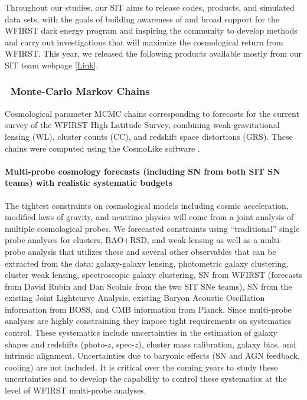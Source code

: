 Throughout our studies, our SIT aims to release codes, products, and simulated data sets, with the goals of building awareness of and broad support for the WFIRST dark energy program and inspiring the community to develop methods and carry out investigations that will maximize the cosmological return from WFIRST. This year, we released the following products available mostly from our SIT team webpage \href{http://www.wfirst-hls-cosmology.org/products/}{[Link]}.

\subsubsection{\CoLi\ Monte-Carlo Markov Chains}

Cosmological parameter MCMC chains corresponding to forecasts for the current survey of the WFIRST High Latitude Survey, combining weak-gravitational lensing (WL), cluster counts (CC), and redshift space distortions (GRS). These chains were computed using the CosmoLike software \citep{Krause2016}.

\paragraph{Multi-probe cosmology forecasts (including SN from both SIT SN teams) with realistic systematic budgets} The tightest constraints on cosmological models including cosmic acceleration, modified laws of gravity, and neutrino physics will come from a joint analysis of multiple cosmological probes. We forecasted constraints using “traditional” single probe analyses for clusters, BAO+RSD, and weak lensing as well as a multi-probe analysis that utilizes these and several other observables that can be extracted from the data: galaxy-galaxy lensing, photometric galaxy clustering, cluster weak lensing, spectroscopic galaxy clustering, SN from WFIRST (forecasts from David Rubin and Dan Scolnic from the two SIT SNe teams), SN from the existing Joint Lightcurve Analysis, existing Baryon Acoustic Oscillation information from BOSS, and CMB information from Planck. Since multi-probe analyses are highly constraining they impose tight requirements on systematics control. These systematics include uncertainties in the estimation of galaxy shapes and redshifts (photo-$z$, spec-$z$), cluster mass calibration, galaxy bias, and intrinsic alignment. Uncertainties due to baryonic effects (SN and AGN feedback, cooling) are not included. It is critical over the coming years to study these uncertainties and to develop the capability to control these systematics at the level of WFIRST multi-probe analyses.


